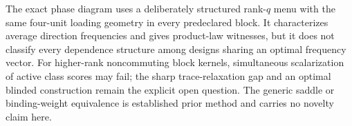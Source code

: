 The exact phase diagram uses a deliberately structured rank-\(q\) menu with the same four-unit loading geometry in every predeclared block. It characterizes average direction frequencies and gives product-law witnesses, but it does not classify every dependence structure among designs sharing an optimal frequency vector. For higher-rank noncommuting block kernels, simultaneous scalarization of active class scores may fail; the sharp trace-relaxation gap and an optimal blinded construction remain the explicit open question. The generic saddle or binding-weight equivalence is established prior method and carries no novelty claim here.